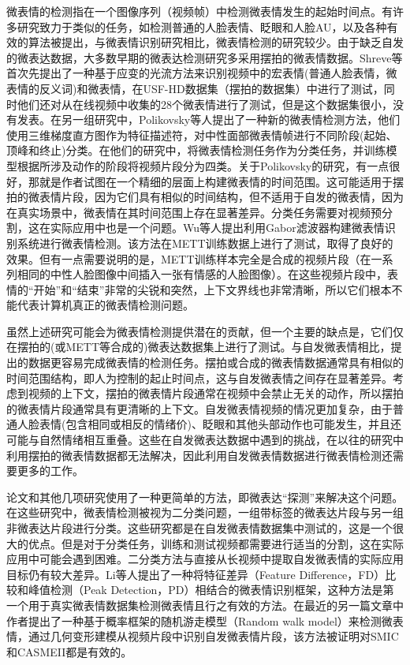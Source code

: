 微表情的检测指在一个图像序列（视频帧）中检测微表情发生的起始时间点。有许多研究致力于类似的任务，如检测普通的人脸表情、眨眼和人脸AU\citep{zeng2006spontaneous,Kr2012Eye, Liwicki2012Incremental}，以及各种有效的算法被提出，与微表情识别研究相比，微表情检测的研究较少。由于缺乏自发的微表达数据，大多数早期的微表达检测研究多采用摆拍的微表情数据。Shreve等首次先提出了一种基于应变的光流方法来识别视频中的宏表情(普通人脸表情，微表情的反义词)和微表情，在USF-HD数据集（摆拍的数据集）中进行了测试，同时他们还对从在线视频中收集的28个微表情进行了测试，但是这个数据集很小，没有发表\citep{shreve2009towards, Shreve2011Macro}。在另一组研究中，Polikovsky等人提出了一种新的微表情检测方法，他们使用三维梯度直方图作为特征描述符，对中性面部微表情帧进行不同阶段(起始、顶峰和终止)分类\citep{Polikovsky2009Facial, Polikovsky2013Facial}。在他们的研究中，将微表情检测任务作为分类任务，并训练模型根据所涉及动作的阶段将视频片段分为四类。关于Polikovsky的研究，有一点很好，那就是作者试图在一个精细的层面上构建微表情的时间范围。这可能适用于摆拍的微表情片段，因为它们具有相似的时间结构，但不适用于自发的微表情，因为在真实场景中，微表情在其时间范围上存在显著差异。分类任务需要对视频预分割，这在实际应用中也是一个问题。Wu等人提出利用Gabor滤波器构建微表情识别系统进行微表情检测\citep{Qi2011The}。该方法在METT训练数据上进行了测试，取得了良好的效果。但有一点需要说明的是，METT训练样本完全是合成的视频片段（在一系列相同的中性人脸图像中间插入一张有情感的人脸图像）。在这些视频片段中，表情的“开始”和“结束”非常的尖锐和突然，上下文界线也非常清晰，所以它们根本不能代表计算机真正的微表情检测问题。

虽然上述研究可能会为微表情检测提供潜在的贡献，但一个主要的缺点是，它们仅在摆拍的(或METT等合成的)微表达数据集上进行了测试。与自发微表情相比，提出的数据更容易完成微表情的检测任务。摆拍或合成的微表情数据通常具有相似的时间范围结构，即人为控制的起止时间点，这与自发微表情之间存在显著差异。考虑到视频的上下文，摆拍的微表情片段通常在视频中会禁止无关的动作，所以摆拍的微表情片段通常具有更清晰的上下文。自发微表情视频的情况更加复杂，由于普通人脸表情(包含相同或相反的情绪价\citep{Warren2009Detecting})、眨眼和其他头部动作也可能发生，并且还可能与自然情绪相互重叠。这些在自发微表达数据中遇到的挑战，在以往的研究中利用摆拍的微表情数据都无法解决，因此利用自发微表情数据进行微表情检测还需要更多的工作。

论文和其他几项研究使用了一种更简单的方法，即微表达“探测”来解决这个问题\citep{ruiz2013encoding, Davison2014Micro, Yao2014Micro}。在这些研究中，微表情检测被视为二分类问题，一组带标签的微表达片段与另一组非微表达片段进行分类。这些研究都是在自发微表情数据集中测试的，这是一个很大的优点。但是对于分类任务，训练和测试视频都需要进行适当的分割，这在实际应用中可能会遇到困难。二分类方法与直接从长视频中提取自发微表情的实际应用目标仍有较大差异。Li等人提出了一种将特征差异（Feature Difference，FD）比较和峰值检测（Peak Detection，PD）相结合的微表情识别框架，这种方法是第一个用于真实微表情数据集检测微表情且行之有效的方法\citep{pfister2011recognising}。在最近的另一篇文章中作者提出了一种基于概率框架的随机游走模型（Random walk model）来检测微表情，通过几何变形建模从视频片段中识别自发微表情片段，该方法被证明对SMIC和CASMEII都是有效的\citep{Xia2016Spontaneous}。

